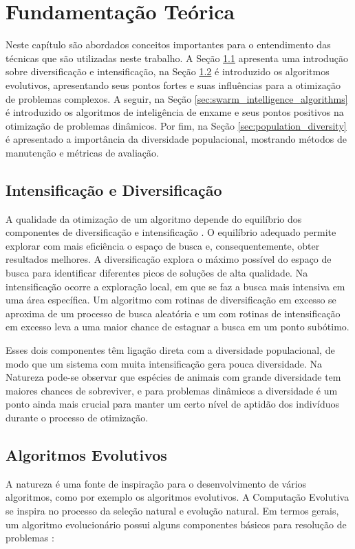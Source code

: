 \chapter{Fundamentação Teórica}
\label{ch:fundamentos}

Neste capítulo são abordados conceitos importantes para o entendimento das técnicas que são utilizadas neste trabalho. A Seção \ref{sec:intesification_diversification} apresenta uma introdução sobre diversificação e intensificação, na Seção \ref{sec:evolutionary_algorithms} é introduzido os algoritmos evolutivos, apresentando seus pontos fortes e suas influências para a otimização de problemas complexos. A seguir, na Seção \ref{sec:swarm_intelligence_algorithms} é introduzido os algoritmos de inteligência de enxame e seus pontos positivos na otimização de problemas dinâmicos. Por fim, na Seção \ref{sec:population_diversity} é apresentado a importância da diversidade populacional, mostrando métodos de manutenção e métricas de avaliação.

\section{Intensificação e Diversificação}
\label{sec:intesification_diversification}

A qualidade da otimização de um algoritmo depende do equilíbrio dos componentes de diversificação e intensificação \cite{vcrepinvsek2013exploration}. O equilíbrio adequado permite explorar com mais eficiência o espaço de busca e, consequentemente, obter resultados melhores. A diversificação explora o máximo possível do espaço de busca para identificar diferentes picos de soluções de alta qualidade. Na intensificação ocorre a exploração local, em que se faz a busca mais intensiva em uma área específica. Um algoritmo com rotinas de diversificação em excesso se aproxima de um processo de busca aleatória e um com rotinas de intensificação em excesso leva a uma maior chance de estagnar a busca em um ponto subótimo.

Esses dois componentes têm ligação direta com a diversidade populacional, de modo que um sistema com muita intensificação gera pouca diversidade. Na Natureza pode-se observar que espécies de animais com grande diversidade tem maiores chances de sobreviver, e para problemas dinâmicos a diversidade é um ponto ainda mais crucial para manter um certo nível de aptidão dos indivíduos durante o processo de otimização.

\section{Algoritmos Evolutivos}
\label{sec:evolutionary_algorithms}
A natureza é uma fonte de inspiração para o desenvolvimento de vários algoritmos, como por exemplo os algoritmos evolutivos. A Computação Evolutiva se inspira no processo da seleção natural e evolução natural.
Em termos gerais, um algoritmo evolucionário possui alguns componentes básicos para resolução de problemas \cite{parpinelli2011new}:

